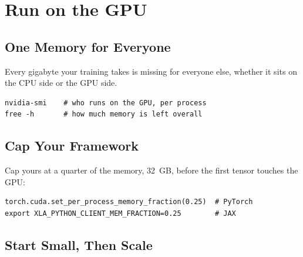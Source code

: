%

\chapter{Run on the GPU}

\section{One Memory for Everyone}

 Every
gigabyte your training takes is missing for everyone else, whether it sits
on the CPU side or the GPU side.
\begin{verbatim}
nvidia-smi    # who runs on the GPU, per process
free -h       # how much memory is left overall
\end{verbatim}

\section{Cap Your Framework}

 Cap yours at a quarter of the memory, 32~GB, before the
first tensor touches the GPU:
\begin{verbatim}
torch.cuda.set_per_process_memory_fraction(0.25)  # PyTorch
export XLA_PYTHON_CLIENT_MEM_FRACTION=0.25        # JAX
\end{verbatim}

\section{Start Small, Then Scale}

